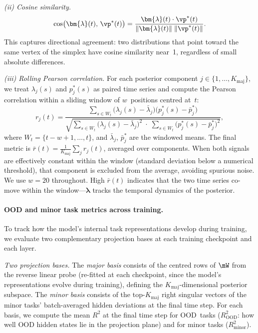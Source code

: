 \emph{(ii) Cosine similarity.}
\begin{equation}
\label{eq:cos_sim}
  \cos\bigl(\bm{\lambda}(t),\, \vp^*(t)\bigr)
  = \frac{\bm{\lambda}(t) \cdot \vp^*(t)}
         {\|\bm{\lambda}(t)\| \;\|\vp^*(t)\|}.
\end{equation}
This captures directional agreement: two distributions that point toward the
same vertex of the simplex have cosine similarity near~1, regardless of small
absolute differences.

\emph{(iii) Rolling Pearson correlation.}
For each posterior component $j \in \{1, \ldots, K_{\mathrm{maj}}\}$, we
treat $\lambda_j(s)$ and $p^*_j(s)$ as paired time series and compute the
Pearson correlation within a sliding window of $w$~positions centred at~$t$:
\begin{equation}
\label{eq:rolling_corr}
  r_j(t) = \frac{
    \sum_{s \in W_t} \bigl(\lambda_j(s) - \bar{\lambda}_j\bigr)
                     \bigl(p^*_j(s)     - \bar{p}^*_j\bigr)
  }{
    \sqrt{\sum_{s \in W_t} \bigl(\lambda_j(s) - \bar{\lambda}_j\bigr)^2
    \;\cdot\;
    \sum_{s \in W_t} \bigl(p^*_j(s) - \bar{p}^*_j\bigr)^2}
  },
\end{equation}
where $W_t = \{t - w + 1, \ldots, t\}$, and $\bar{\lambda}_j$, $\bar{p}^*_j$
are the windowed means.
The final metric is $\bar{r}(t) = \frac{1}{K_{\mathrm{maj}}}
\sum_j r_j(t)$, averaged over components.
When both signals are effectively constant within the window
(standard deviation below a numerical threshold), that component is excluded
from the average, avoiding spurious noise.
We use $w = 20$ throughout.
High $\bar{r}(t)$ indicates that the two time series co-move within the
window---$\bm{\lambda}$ tracks the temporal dynamics of the posterior.

\paragraph{OOD and minor task metrics across training.}
To track how the model's internal task representations develop during training,
we evaluate two complementary projection bases at each training checkpoint and
each layer.

\emph{Two projection bases.}
The \emph{major basis} consists of the centred rows of $\mW$ from the reverse
linear probe (re-fitted at each checkpoint, since the model's representations
evolve during training), defining the $K_{\mathrm{maj}}$-dimensional posterior
subspace.
The \emph{minor basis} consists of the top-$K_{\mathrm{maj}}$ right singular
vectors of the minor tasks' batch-averaged hidden deviations at the final
time step.
For each basis, we compute the mean $R^2$ at the final time step for OOD~tasks
($R^2_{\mathrm{OOD}}$: how well OOD hidden states lie in the projection plane)
and for minor tasks ($R^2_{\mathrm{minor}}$).

